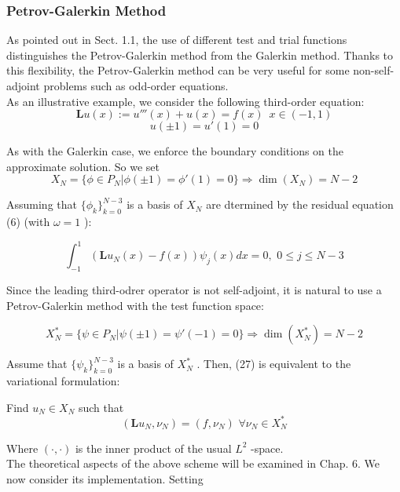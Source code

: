 \subsubsection{Petrov-Galerkin Method}

As pointed out in Sect. 1.1, the use of different test and trial functions distinguishes the Petrov-Galerkin method from the Galerkin method. Thanks to this flexibility, the Petrov-Galerkin method can be very useful for some non-self-adjoint problems such as odd-order equations. \\
\indent As an illustrative example, we consider the following third-order equation:
\begin{equation}
	\mathbf{ L } u(x) := u'''(x) + u(x) = f(x)\, \hspace{4pt} x \in (-1,1)
\end{equation}
\[
	u( \pm 1) = u'(1) = 0
\]

As with the Galerkin case, we enforce the boundary conditions on the approximate solution. So we set
\[
	X_{ N } = \{ \phi \in P_{ N } \vert \phi( \pm 1) = \phi' (1) = 0 \} \Rightarrow \dim (X_{ N }) = N-2
\]

Assuming that $ \{ \phi_{ k } \}_{ k=0 }^{ N-3 } $ is a basis of $ X_{ N } $ are dtermined by the residual equation (6) (with $ \omega = 1 $ ):

\begin{equation}
	\int_{ -1 }^{ 1 } \left( \mathbf{ L } u_{ N } (x) - f(x) \right) \psi_{ j } (x) dx = 0, \hspace{4pt} 0 \leq j \leq N-3
\end{equation}

Since the leading third-odrer operator is not self-adjoint, it is natural to use a Petrov-Galerkin method with the test function space:

\[
	X_{ N }^{ * } = \{ \psi \in P_{ N } \vert \psi( \pm 1) = \psi'(-1) = 0 \} \Rightarrow \dim ( X^{ * }_{ N } ) = N-2
\]

Assume that $ \{ \psi_{ k } \}_{ k=0 }^{ N-3 } $ is a basis of $ X^{ * }_{ N } $ . Then, (27) is equivalent to the variational formulation:

\begin{center}
	Find $ u_{ N } \in X_{ N } $ such that
	\[
		\left( \mathbf{ L }u_{ N }, \nu_{ N } \right) = \left( f, \nu_{ N } \right) \hspace{4pt} \forall \nu_{ N } \in X^{ * }_{ N }
	\]
\end{center}

Where $ \left( \cdot, \cdot \right) $ is the inner product of the usual $ L^{ 2 } $ -space. \\
\indent The theoretical aspects of the above scheme will be examined in Chap. 6. We now consider its implementation. Setting

